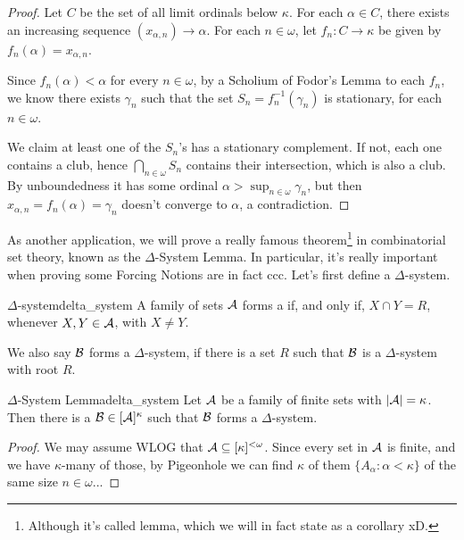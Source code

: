 \begin{proof}
    Let $C$ be the set of all limit ordinals below $\kappa$. For each $\alpha\in C$, there exists an increasing sequence $(x_{\alpha,n})\to \alpha$. For each $n\in\omega$, let $f_n:C\to\kappa$ be given by $f_n(\alpha)=x_{\alpha,n}$.

    Since $f_n(\alpha)<\alpha$ for every $n\in\omega$, by a Scholium of Fodor's Lemma to each $f_n$, we know there exists $\gamma_n$ such that the set $S_n=f^{-1}_n(\gamma_n)$ is stationary, for each $n\in\omega$.

    We claim at least one of the $S_n$'s has a stationary complement. If not, each one contains a club, hence $\bigcap_{n\in\omega}S_n$ contains their intersection, which is also a club. By unboundedness it has some ordinal $\alpha>\sup_{n\in\omega}\gamma_n$, but then $x_{\alpha,n}=f_n(\alpha)=\gamma_n$ doesn't converge to $\alpha$, a contradiction.
\end{proof}

As another application, we will prove a really famous theorem\footnote{Although it's called lemma, which we will in fact state as a corollary xD.} in combinatorial set theory, known as the $\Delta$-System Lemma. In particular, it's really important when proving some Forcing Notions are in fact ccc. Let's first define a $\Delta$-system.

\begin{definition}{$\Delta$-system}{delta_system}
    A family of sets $\mathcal{A}$ forms a  if, and only if, $X\cap Y=R$, whenever $X,Y\in\mathcal{A}$, with $X\neq Y$.
\end{definition}

We also say $\mathcal{B}$ forms a $\Delta$-system, if there is a set $R$ such that $\mathcal{B}$ is a $\Delta$-system with root $R$.

\begin{corollary}{$\Delta$-System Lemma}{delta_system}
    Let $\mathcal{A}$ be a family of finite sets with $\lvert\mathcal{A}\rvert=\kappa$. Then there is a $\mathcal{B}\in[\mathcal{A}]^\kappa$ such that $\mathcal{B}$ forms a $\Delta$-system.
\end{corollary}

\begin{proof}
    We may assume WLOG that $\mathcal{A}\subseteq[\kappa]^{<\omega}$. Since every set in $\mathcal{A}$ is finite, and we have $\kappa$-many of those, by Pigeonhole we can find $\kappa$ of them $\{A_\alpha:\alpha<\kappa\}$ of the same size $n\in\omega$...
\end{proof}

